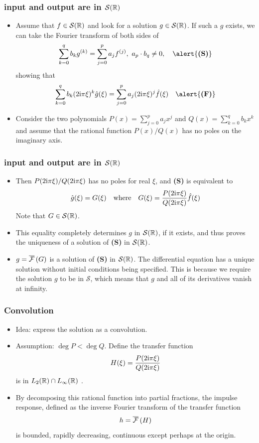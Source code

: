 \begin{frame}
\frametitle{input and output are in $\mathcal{S}(\mathbb{R})$}
\begin{itemize}
\item Assume that $f\in \mathcal{S}(\mathbb{R})$ and look for a solution $g \in \mathcal{S}(\mathbb{R})$. If such a $g$ exists, we can take the Fourier transform of both sides of
$$
\sum_{k=0}^{q}b_{k}g^{(k)}=\sum_{j=0}^{p}a_{j}f^{(j)},\ a_{p}\cdot b_{q}\neq 0,  \quad \alert{\textbf{(S)}}
$$
showing that
$$
\sum_{k=0}^{q}b_{k}(2\rmi\pi\xi)^{k}\hat{g}(\xi)=\sum_{j=0}^{p}a_{j}(2\rmi\pi\xi)^{j}\hat{f}(\xi) \quad \alert{\textbf{(F)}}
$$
\item Consider the two polynomials $P(x)= \sum_{j=0}^{p}a_{j}x^{j}$ and $Q(x)=\sum_{k=0}^{q}b_{k}x^{k}$
and assume that the rational function $P(x)/Q(x)$ has no poles on the imaginary axis.
\end{itemize}
\end{frame}

\begin{frame}
\frametitle{input and output are in $\mathcal{S}(\mathbb{R})$}
\begin{itemize}
\item Then $P(2 \mathrm{i}\pi\xi)/Q(2 \mathrm{i} \pi\xi)$ has no poles for real $\xi$, and  \alert{\textbf{(S)}} is equivalent to
$$
\hat{g}(\xi)= G(\xi) \quad \text{where} \quad G(\xi)= \frac{P(2 \mathrm{i} \pi\xi)}{Q(2\mathrm{i} \pi\xi)}\hat{f}(\xi)
$$
Note that \alert{$G \in \mathcal{S}(\mathbb{R})$}.
\item This equality completely determines $g$ in $\mathcal{S}(\mathbb{R})$, if it exists, and thus proves the uniqueness of a solution of \alert{\textbf{(S)}} in $\mathcal{S}(\mathbb{R})$.
\item $g=\overline{\mathcal{F}}\left( G \right)$ is a solution of \alert{\textbf{(S)}} in $\mathcal{S}(\mathbb{R})$.
{\tiny The differential equation has a unique solution without initial conditions being specified. This is because we require the solution $g$ to be in $\mathcal{S}$, which means that $g$ and all of its derivatives vanish at infinity.}
\end{itemize}
\end{frame}

\begin{frame}
\frametitle{Convolution}
\begin{itemize}
\item \alert{Idea:} express the solution as a convolution.
\item \alert{Assumption:} $\deg P<\deg Q$. Define the \alert{transfer function}
$$
H(\xi)=\frac{P(2 \mathrm{i} \pi\xi)}{Q(2 \mathrm{i} \pi\xi)}
$$
is in $L_2(\mathbb{R}) \cap L_\infty(\mathbb{R})$ .
\item By decomposing this rational function into partial fractions, the \alert{impulse response}, defined as the inverse Fourier transform of the \alert{transfer function}
$$ 
h=\overline{\mathcal{F}}\left( H \right) 
$$
is bounded, rapidly decreasing, continuous except perhaps at the origin.
\end{itemize}
\end{frame}    

